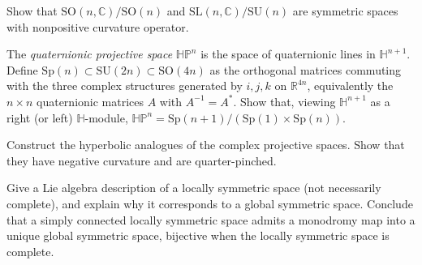 \begin{remark}
  \label{rem:pet-ch10-exercise-son-c-sln-c-symmetric}

  Show that $\mathrm{SO}(n,\mathbb C)/\mathrm{SO}(n)$ and
  $\mathrm{SL}(n,\mathbb C)/\mathrm{SU}(n)$ are symmetric spaces with nonpositive
  curvature operator.
\end{remark}

\begin{remark}
  \label{rem:pet-ch10-exercise-quaternionic-projective-space}

  The \emph{quaternionic projective space} $\mathbb{HP}^n$ is the space of
  quaternionic lines in $\mathbb H^{n+1}$. Define $\mathrm{Sp}(n)\subset\mathrm{SU}(2n)\subset\mathrm{SO}(4n)$
  as the orthogonal matrices commuting with the three complex structures
  generated by $i,j,k$ on $\mathbb R^{4n}$, equivalently the $n\times n$
  quaternionic matrices $A$ with $A^{-1}=A^*$. Show that, viewing $\mathbb H^{n+1}$
  as a right (or left) $\mathbb H$-module, $\mathbb{HP}^n=\mathrm{Sp}(n+1)/(\mathrm{Sp}(1)\times\mathrm{Sp}(n))$.
\end{remark}

\begin{remark}
  \label{rem:pet-ch10-exercise-hyperbolic-complex-projective}

  Construct the hyperbolic analogues of the complex projective spaces. Show
  that they have negative curvature and are quarter-pinched.
\end{remark}

\begin{remark}
  \label{rem:pet-ch10-exercise-lie-algebra-locally-symmetric}

  Give a Lie algebra description of a locally symmetric space (not necessarily
  complete), and explain why it corresponds to a global symmetric space.
  Conclude that a simply connected locally symmetric space admits a monodromy
  map into a unique global symmetric space, bijective when the locally
  symmetric space is complete.
\end{remark}

